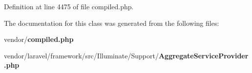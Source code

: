 Definition at line 4475 of file compiled.\+php.



The documentation for this class was generated from the following files\+:\begin{DoxyCompactItemize}
\item 
vendor/{\bf compiled.\+php}\item 
vendor/laravel/framework/src/\+Illuminate/\+Support/{\bf Aggregate\+Service\+Provider.\+php}\end{DoxyCompactItemize}
